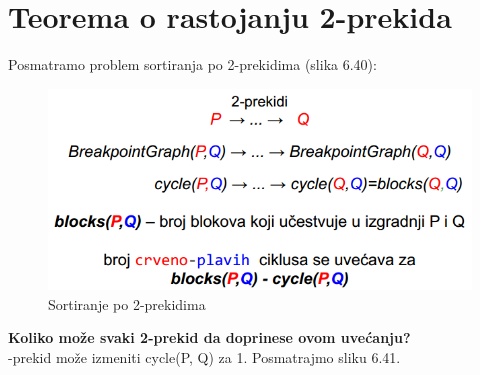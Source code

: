 \newpage
\section{Teorema o rastojanju 2-prekida}
Posmatramo problem sortiranja po 2-prekidima (slika 6.40):
\begin{figure}[h!]
\centering
\includegraphics[scale=0.7]{poglavlja/6/slike/sortiranje2prekidi.PNG}
\caption{Sortiranje po 2-prekidima}
\label{slika:X}
\end{figure}

\noindent \textbf{Koliko može svaki 2-prekid da doprinese ovom uvećanju?}\\

-prekid može izmeniti cycle(P, Q) za 1. Posmatrajmo sliku 6.41.\\

